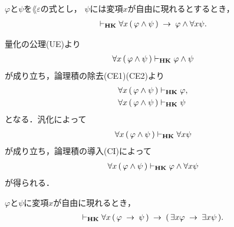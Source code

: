 	\begin{screen}
		\begin{thm}[論理積と全称の交換]
		\label{classic:commutation_of_conjunction_and_universal_quantifier}
			$\varphi$と$\psi$を$\lang{\varepsilon}$の式とし，
			$\psi$には変項$x$が自由に現れるとするとき，
			\begin{align}
				\vdash_{{\scriptsize \mbox{{\bf HK}}}} \forall x\, (\, \varphi \wedge \psi\, )
				\hspace{0.25em}\rightarrow\hspace{0.25em} \varphi \wedge \forall x \psi.
			\end{align}
		\end{thm}
	\end{screen}
	
	\begin{sketch}
		量化の公理(UE)より
		\begin{align}
			\forall x\, (\, \varphi \wedge \psi\, ) \vdash_{{\scriptsize \mbox{{\bf HK}}}} 
			\varphi \wedge \psi
		\end{align}
		が成り立ち，論理積の除去(CE1)(CE2)より
		\begin{align}
			\forall x\, (\, \varphi \wedge \psi\, ) &\vdash_{{\scriptsize \mbox{{\bf HK}}}} \varphi, \\
			\forall x\, (\, \varphi \wedge \psi\, ) &\vdash_{{\scriptsize \mbox{{\bf HK}}}} \psi
		\end{align}
		となる．汎化によって
		\begin{align}
			\forall x\, (\, \varphi \wedge \psi\, ) \vdash_{{\scriptsize \mbox{{\bf HK}}}} 
			\forall x \psi
		\end{align}
		が成り立ち，論理積の導入(CI)によって
		\begin{align}
			\forall x\, (\, \varphi \wedge \psi\, ) \vdash_{{\scriptsize \mbox{{\bf HK}}}} 
			\varphi \wedge \forall x \psi
		\end{align}
		が得られる．
		\QED
	\end{sketch}
	
	\begin{screen}
		\begin{thm}
			$\varphi$と$\psi$に変項$x$が自由に現れるとき，
			\begin{align}
				\vdash_{{\scriptsize \mbox{{\bf HK}}}} \forall x\, (\, \varphi \hspace{0.25em}\rightarrow\hspace{0.25em} \psi\, )
				\hspace{0.25em}\rightarrow\hspace{0.25em} (\, \exists x \varphi \hspace{0.25em}\rightarrow\hspace{0.25em} \exists x \psi\, ).
			\end{align}
		\end{thm}
	\end{screen}
	
